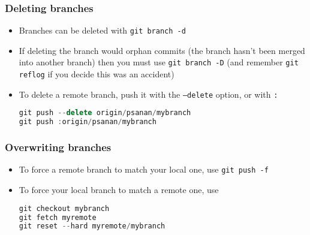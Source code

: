 \begin{frame}[fragile]
\frametitle{Deleting branches}
\begin{itemize}
\item Branches can be deleted with \lstinline{git branch -d}
\item If deleting the branch would orphan commits (the branch hasn't been merged into another branch) then you must use \lstinline{git branch -D} (and remember \lstinline{git reflog} if you decide this was an accident)
\item To delete a remote branch, push it with the \texttt{--delete} option, or with \lstinline{:}
\begin{lstlisting}[language=C++]
git push --delete origin/psanan/mybranch
git push :origin/psanan/mybranch
\end{lstlisting}
\end{itemize}
\end{frame}

\begin{frame}[fragile]
\frametitle{Overwriting branches}
\begin{itemize}
\item To force a remote branch to match your local one, use \lstinline{git push -f}
\item To force your local branch to match a remote one, use
\begin{lstlisting}[language=C++]
git checkout mybranch
git fetch myremote
git reset --hard myremote/mybranch
\end{lstlisting}
\end{itemize}
\end{frame}

